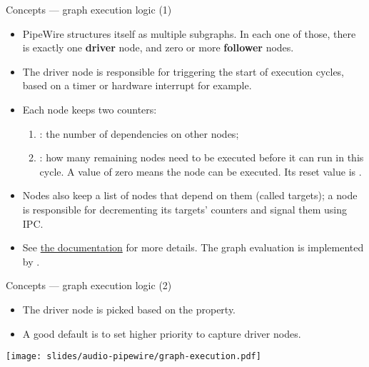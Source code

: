 \begin{frame}{Concepts — graph execution logic (1)}
  \begin{itemize}

  \item PipeWire structures itself as multiple subgraphs. In each one
    of those, there is exactly one \textbf{driver} node, and zero or
    more \textbf{follower} nodes.

  \item The driver node is responsible for triggering the start of
    execution cycles, based on a timer or hardware interrupt for example.

  \item Each node keeps two counters:
    \begin{enumerate}
    \item {}: the number of dependencies on other nodes;
    \item {}: how many remaining nodes need to be executed
      before it can run in this cycle. A value of zero means the node
      can be executed. Its reset value is .
    \end{enumerate}

  \item Nodes also keep a list of nodes that depend on them (called
    targets); a node is responsible for decrementing its targets'
     counters and signal them using IPC.

  \item See \href{https://docs.pipewire.org/page_scheduling.html}{the
    documentation} for more details. The graph evaluation is
    implemented by .

  \end{itemize}
\end{frame}



\begin{frame}{Concepts — graph execution logic (2)}
  \begin{itemize}
  \item The driver node is picked based on the  property.
  \item A good default is to set higher priority to capture driver nodes.
  \end{itemize}

  \begin{center}
    \texttt{[image: slides/audio-pipewire/graph-execution.pdf]}\\
  \end{center}
\end{frame}



